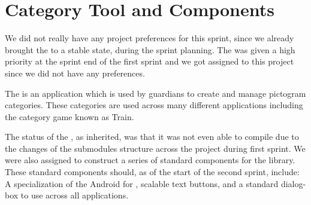 \section{Category Tool and Components}

We did not really have any project preferences for this sprint, since we already brought the \launcher to a stable state, during the sprint planning. The \giraf \ct was given a high priority at the sprint end of the first sprint and we got assigned to this project since we did not have any preferences. 

The \giraf \ct is an application which is used by guardians to create and manage pictogram categories. These categories are used across many different applications including the category game known as Train.

The status of the \ct, as inherited, was that it was not even able to compile due to the changes of the submodules structure across the project during first sprint. We were also assigned to construct a series of standard components for the \gc library. These standard components should, as of the start of the second sprint, include: A specialization of the Android  for \giraf, scalable text buttons, and a standard dialog-box to use across all applications.
